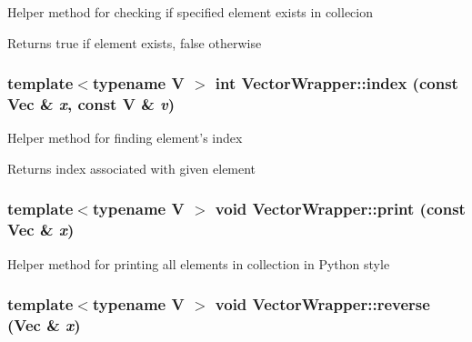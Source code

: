 \label{struct_stl_containers_wrappers_1_1_vector_wrapper_a3b81b39869a283c7879e928c0e5718ee}
Helper method for checking if specified element exists in collecion \begin{DoxyReturn}{Returns}
true if element exists, false otherwise 
\end{DoxyReturn}
\hypertarget{struct_stl_containers_wrappers_1_1_vector_wrapper_a9b0dd780822b82e7c04648a54d1700b2}{
\subsubsection[{index}]{\setlength{\rightskip}{0pt plus 5cm}template$<$typename V $>$ int VectorWrapper::index (const Vec \& {\em x}, \/  const V \& {\em v})}}
\label{struct_stl_containers_wrappers_1_1_vector_wrapper_a9b0dd780822b82e7c04648a54d1700b2}
Helper method for finding element's index \begin{DoxyReturn}{Returns}
index associated with given element 
\end{DoxyReturn}
\hypertarget{struct_stl_containers_wrappers_1_1_vector_wrapper_ac25e1d43171eafc2862605115b33ca9f}{
\subsubsection[{print}]{\setlength{\rightskip}{0pt plus 5cm}template$<$typename V $>$ void VectorWrapper::print (const Vec \& {\em x})}}
\label{struct_stl_containers_wrappers_1_1_vector_wrapper_ac25e1d43171eafc2862605115b33ca9f}
Helper method for printing all elements in collection in Python style \hypertarget{struct_stl_containers_wrappers_1_1_vector_wrapper_affef01a389d364fe81de5bb7234b8b4b}{
\subsubsection[{reverse}]{\setlength{\rightskip}{0pt plus 5cm}template$<$typename V $>$ void VectorWrapper::reverse (Vec \& {\em x})}}
